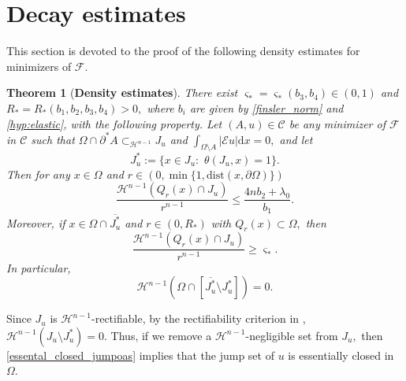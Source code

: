 \documentclass[reqno]{amsart}
\numberwithin{equation}{section}
\theoremstyle{plain}
\newtheorem{theorem}{Theorem}[section]
\theoremstyle{definition}
\newcommand{\cH}{\mathcal{H}}
\newcommand{\cF}{\mathcal{F}}
\newcommand{\p}{\partial}
\newcommand{\cl}[1]{\overline{#1}}
\newcommand{\bound}{b}
\renewcommand{\d}{\mathrm{d}}
\newcommand{\dist}{\mathrm{dist}}
\newcommand{\str}[1]{\mathcal{E}#1}
\newcommand{\admissible}{\mathcal{C}}
\begin{document}
\section{Decay estimates}\label{sec:decay_estimates} 


This section is devoted to the proof of the following density estimates for minimizers of $\cF$. 

\begin{theorem}[\textbf{Density estimates}]\label{teo:density_estimates}
%
There exist $\varsigma_*=\varsigma_*(\bound_3,\bound_4)\in(0,1)$ and $R_*=R_*(\bound_1,\bound_2,\bound_3,\bound_4)>0,$ where $\bound_i$ are given by \eqref{finsler_norm} and \eqref{hyp:elastic}, with the following property. Let $(A,u)\in\admissible$ be any minimizer of $\cF$ in $\admissible$ such that $\Omega\cap\p^*A\subset_{\cH^{n-1}} J_u$ and $\int_{\Omega\setminus A}|\str{u}|\d x=0,$ and let 
\begin{equation}\label{def_Ju_starrr}
J_u^* :=\{x\in J_u:\,\,\theta(J_u,x)=1\}.  
\end{equation}
% 
Then for any $x\in\Omega$ and $r\in(0,\min\{1,\dist(x,\p \Omega)\})$
%
\begin{equation}\label{min_seq_density_up}
\frac{\cH^{n-1}(Q_r(x)\cap J_u)}{r^{n-1}} \le \frac{4n\bound_2 + \lambda_0}{\bound_1}. 
\end{equation}
Moreover, if $x\in \Omega\cap \cl{J_u^*}$ and $r\in(0,R_*)$ with $Q_r(x)\subset \Omega,$ then  
\begin{equation}\label{min_seq_density_low}
\frac{\cH^{n-1}(Q_r(x)\cap J_u)}{r^{n-1}} \ge \varsigma_*. 
\end{equation} 
%
In particular, 
\begin{equation}\label{essental_closed_jumpoas}
\cH^{n-1}(\Omega\cap [\cl{J_u^*}\setminus J_u^*])=0. 
\end{equation} 
\end{theorem}
 
Since $J_u$ is $\cH^{n-1}$-rectifiable, by the rectifiability criterion in \cite[Theorem 2.63]{AFP:2000}, $\cH^{n-1}(J_u\setminus J_u^*)=0.$ Thus, if we remove a $\cH^{n-1}$-negligible set from $J_u,$ then \eqref{essental_closed_jumpoas} implies that the jump set of $u$ is essentially closed in $\Omega$.
 
\end{document}
